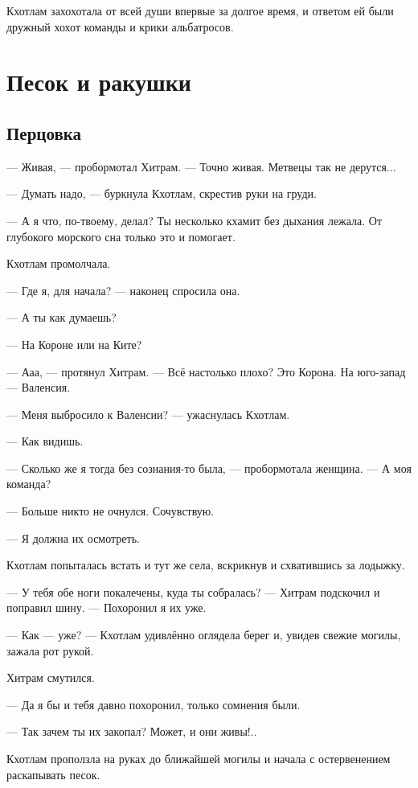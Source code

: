 Кхотлам захохотала от всей души впервые за долгое время, и ответом ей были дружный хохот команды и крики альбатросов.

\chapter{Песок и ракушки}

\section{Перцовка}

--- Живая, --- пробормотал Хитрам.
--- Точно живая.
Метвецы так не дерутся...

--- Думать надо, --- буркнула Кхотлам, скрестив руки на груди.

--- А я что, по-твоему, делал?
Ты несколько кхамит без дыхания лежала.
От глубокого морского сна только это и помогает.

Кхотлам промолчала.

--- Где я, для начала? --- наконец спросила она.

--- А ты как думаешь?

--- На Короне или на Ките?

--- Ааа, --- протянул Хитрам.
--- Всё настолько плохо?
Это Корона.
На юго-запад --- Валенсия.

--- Меня выбросило к Валенсии? --- ужаснулась Кхотлам.

--- Как видишь.

--- Сколько же я тогда без сознания-то была, --- пробормотала женщина.
--- А моя команда?

--- Больше никто не очнулся.
Сочувствую.

--- Я должна их осмотреть.

Кхотлам попыталась встать и тут же села, вскрикнув и схватившись за лодыжку.

--- У тебя обе ноги покалечены, куда ты собралась? --- Хитрам подскочил и поправил шину.
--- Похоронил я их уже.

--- Как --- уже? --- Кхотлам удивлённо оглядела берег и, увидев свежие могилы, зажала рот рукой.

Хитрам смутился.

--- Да я бы и тебя давно похоронил, только сомнения были.

--- Так зачем ты их закопал?
Может, и они живы!..

Кхотлам проползла на руках до ближайшей могилы и начала с остервенением раскапывать песок.

